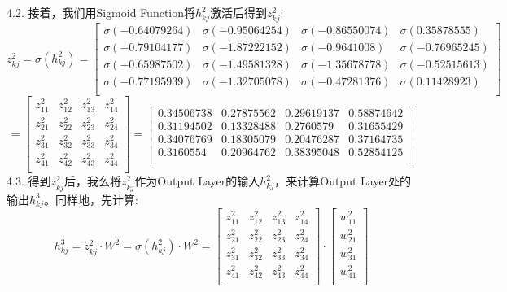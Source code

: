 \documentclass[a4paper,12pt,oneside]{book}
\begin{document}
4.2. 接着，我们用Sigmoid Function将$h^2_{kj}$激活后得到$z^2_{kj}$:
\begin{equation*}
    z^2_{kj} = \sigma(h^2_{kj})
    = \begin{bmatrix}
        \sigma(-0.64079264) & \sigma(-0.95064254) & \sigma(-0.86550074) & \sigma(0.35878555)\\
        \sigma(-0.79104177) & \sigma(-1.87222152) & \sigma(-0.9641008) & \sigma(-0.76965245)\\
        \sigma(-0.65987502) & \sigma(-1.49581328) & \sigma(-1.35678778) & \sigma(-0.52515613)\\
        \sigma(-0.77195939) & \sigma(-1.32705078) & \sigma(-0.47281376) & \sigma(0.11428923)\\
    \end{bmatrix}
\end{equation*}
\begin{equation*}
    = \begin{bmatrix}
        z^2_{11} & z^2_{12} & z^2_{13} & z^2_{14} \\
        z^2_{21} & z^2_{22} & z^2_{23} & z^2_{24} \\
        z^2_{31} & z^2_{32} & z^2_{33} & z^2_{34} \\
        z^2_{41} & z^2_{42} & z^2_{43} & z^2_{44} \\
    \end{bmatrix}
    = \begin{bmatrix}
        0.34506738 & 0.27875562 & 0.29619137 & 0.58874642\\
        0.31194502 & 0.13328488 & 0.2760579 & 0.31655429\\
        0.34076769 & 0.18305079 & 0.20476287 & 0.37164735\\
        0.3160554  & 0.20964762 & 0.38395048 & 0.52854125\\
     \end{bmatrix}
\end{equation*}
4.3. 得到$z^2_{kj}$后，我么将$z^2_{kj}$作为Output Layer的输入$h^2_{kj}$，来计算Output Layer处的输出$h^3_{kj}$。同样地，先计算:\\
\begin{equation*}
    h^3_{kj} = z^2_{kj} \cdot W^2 = \sigma(h^2_{kj}) \cdot W^2
    = \begin{bmatrix}
        z^2_{11} & z^2_{12} & z^2_{13} & z^2_{14} \\
        z^2_{21} & z^2_{22} & z^2_{23} & z^2_{24} \\
        z^2_{31} & z^2_{32} & z^2_{33} & z^2_{34} \\
        z^2_{41} & z^2_{42} & z^2_{43} & z^2_{44} \\
    \end{bmatrix} \cdot
    \begin{bmatrix}
        w^2_{11}\\
        w^2_{21}\\
        w^2_{31}\\
        w^2_{41}\\
    \end{bmatrix}
\end{equation*}
\end{document}
